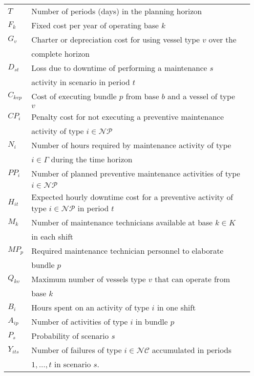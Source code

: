 \begin{tabular}{ll}
	$T$ & Number of periods (days) in the planning horizon\\
	$F_{k}$ 	&	Fixed cost per year of operating base $k$\\
	$G_{v}$ 	&	Charter or depreciation cost for using vessel type $v$ over the \\
				&    complete horizon\\
	$D_{st}$	&	Loss due to downtime of performing a maintenance  $s$\\ 
				& activity in scenario in period $t$ \\
	$C_{kvp}$ 	&	Cost of executing bundle $p$ from base $b$ and a vessel of type\\
				& $v$\\
	$CP_i$ 		&	Penalty cost for not executing a preventive maintenance\\
				& activity of type $i\in \mathcal{NP}$\\
	$N_{i}$ 		&	\parbox[t]{10cm}{Number of hours required by maintenance activity of type}\\
					& $i\in \Gamma$ during the time horizon\\
	$PP_{i}$ 		&	Number of planned preventive maintenance activities of type\\
					& $i\in \mathcal{NP}$\\	
	$H_{i t}$ 		&	\parbox[t]{10cm}{Expected hourly downtime cost for a preventive  activity of type $i\in \mathcal{NP}$ in period $t$}\\
	$M_{k}$ 		&	Number of maintenance technicians available at base $k\in K$\\
					& in each shift\\
	$MP_{p}$ 		&	\parbox[t]{10cm}{Required maintenance technician personnel to elaborate}\\
					& bundle $p$\\
	$Q_{kv}$ 		& \parbox[t]{10cm}{Maximum number of vessels type $v$ that can operate from}\\
					& base $k$\\
	$B_{i}$ &	Hours spent on an activity of type $i$ in one shift\\
	$A_{ip}$ 		&	Number of activities of type $i$ in bundle $p$\\
	$P_s$ 		&	Probability of scenario $s$\\
	$Y_{its}$ 	& 	\parbox[t]{10cm}{Number of failures of type $i\in\mathcal{NC}$ accumulated in periods}\\
				& $1,\ldots,t$ in scenario $s$.
	\\
\end{tabular}

